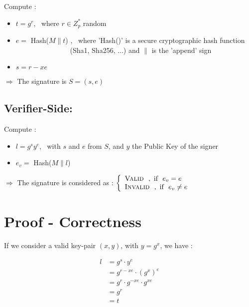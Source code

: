 \documentclass{article}
\begin{document}
Compute : \

\begin{itemize}

	\item $t = g^r$, \ where $r \in Z_p^*$ random

	\item $e =$ Hash($M \| t$) , \ where 'Hash()' is a secure cryptographic hash function \\ \vphantom{...} $\>$ $\>$ $\>$ $\>$ $\>$ $\>$ $\>$ $\>$ $\>$ $\>$ $\>$ $\>$ $\>$ $\>$ (Sha1, Sha256, ...) and $\|$ is the 'append' sign

	\item $s = r - x e$

\end{itemize}

$\Rightarrow$ The signature is $S = (s, e)$


\subsection{Verifier-Side:}

Compute : \

\begin{itemize}

	\item $l = g^s y^e$, \ with $s$ and $e$ from $S$, and $y$ the Public Key of the signer

	\item $e_v =$ Hash($M \| l$)

\end{itemize}

$\Rightarrow$ The signature is considered as :
	$
    \left\{
        \begin{array}{ll}
        	\textsc{Valid} \ \ , \  \text{if } \ e_v = e \\
        	\textsc{Invalid} \ \ , \  \text{if } \ e_v \neq e
        \end{array}
    \right.
   	$







\section{Proof - Correctness}

If we consider a valid key-pair $(x,y)$, with $y = g^x$, we have :

$$
\begin{align*}
l &= g^s \cdot y^e \\
  &= g^{r - xe} \cdot (g^x)^e \\
  &= g^r \cdot g^{-xe} \cdot g^{xe} \\
  &= g^r \\
  &= t
\end{align*}
$$
\end{document}

